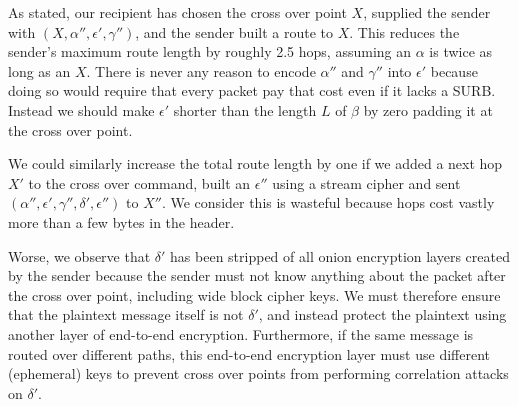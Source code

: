 \documentclass[twoside,letterpaper]{llncs}
\begin{document}
As stated, our recipient has chosen the cross over point $X$,
supplied the sender with $(X,\alpha'',\epsilon',\gamma'')$,
and the sender built a route to $X$.  This reduces the sender's
maximum route length by roughly 2.5 hops, assuming an $\alpha$
is twice as long as an $X$.
There is never any reason to encode
$\alpha''$ and $\gamma''$ into $\epsilon'$ because doing so
would require that every packet pay that cost even if it lacks a SURB.
Instead we should make $\epsilon'$ shorter than the length $L$ of
$\beta$ by zero padding it at the cross over point.

We could similarly increase the total route length by one if
we added a next hop $X'$ to the cross over command, built an
$\epsilon''$ using a stream cipher and sent
 $(\alpha'',\epsilon',\gamma'',\delta',\epsilon'')$ to $X''$.
We consider this is wasteful because hops cost vastly more than
a few bytes in the header.

Worse, we observe that $\delta'$ has been stripped of all onion
encryption layers created by the sender because the sender must not
know anything about the packet after the cross over point,
 including wide block cipher keys.
We must therefore ensure that the plaintext message itself
 is not $\delta'$, and instead protect the plaintext using
 another layer of end-to-end encryption.
 Furthermore, if the same message is routed over different
 paths, this end-to-end encryption layer must use different
 (ephemeral) keys to prevent cross over points from performing
 correlation attacks on $\delta'$.

\end{document}
